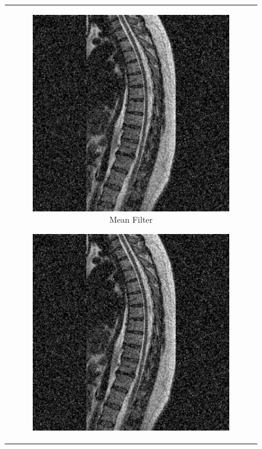 \documentclass[hidelinks,12pt]{article}
\begin{document}
	\begin{figure}[!h]
		\centering
		\begin{tabular}{c}
			\begin{subfigure}[h]{0.3\textwidth}
				\centering
				\includegraphics[width=\textwidth]{figures/spine_mri/mean.jpg}
				\caption{Mean Filter}
			\end{subfigure}
			\hfill
			\begin{subfigure}[h]{0.3\textwidth}
				\centering
				\includegraphics[width=\textwidth]{figures/spine_mri/gaussian.jpg}

\end{subfigure}
\end{tabular}
\end{figure}
\end{document}
